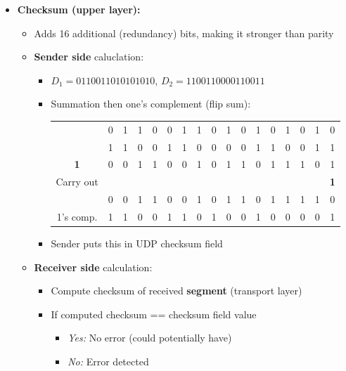 \documentclass{article}
\begin{document}
\begin{itemize}
    \item \textbf{Checksum (upper layer):}
    \begin{itemize}
        \item Adds 16 additional (redundancy) bits, making it stronger than parity
        \item \textbf{Sender side} caluclation:
        \begin{itemize}
            \item $D_1=01100110 10101010$, $D_2=11001100 00110011$
            \item Summation then one's complement (flip sum):
            \begin{center}
                \begin{tabular}{ccccccccccccccccc}
                    & 0 & 1 & 1 & 0 & 0 & 1 & 1 & 0 & 1 & 0 & 1 & 0 & 1 & 0 & 1 & 0 \\
                    & 1 & 1 & 0 & 0 & 1 & 1 & 0 & 0 & 0 & 0 & 1 & 1 & 0 & 0 & 1 & 1 \\
                    \hline
                    \textbf{1} & 0 & 0 & 1 & 1 & 0 & 0 & 1 & 0 & 1 & 1 & 0 & 1 & 1 & 1 & 0 & 1 \\
                    Carry out & & & & & & & & & & & & & & & & \textbf{1} \\
                    \hline
                    & 0 & 0 & 1 & 1 & 0 & 0 & 1 & 0 & 1 & 1 & 0 & 1 & 1 & 1 & 1 & 0 \\
                    \hline
                    1's comp. & 1 & 1 & 0 & 0 & 1 & 1 & 0 & 1 & 0 & 0 & 1 & 0 & 0 & 0 & 0 & 1
                \end{tabular}
            \end{center}
            \item Sender puts this in UDP checksum field
        \end{itemize}
        \item \textbf{Receiver side} calculation:
        \begin{itemize}
            \item Compute checksum of received \textbf{segment} (transport layer) 
            \item If computed checksum == checksum field value
            \begin{itemize}
                \item \textit{Yes:} No error (could potentially have)
                \item \textit{No:} Error detected
            \end{itemize}

\end{itemize}
\end{itemize}
\end{itemize}
\end{document}
